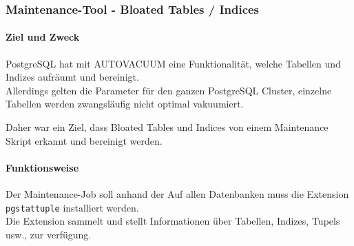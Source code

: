 
\begin{flushleft}
    \subsubsection{Maintenance-Tool - Bloated Tables / Indices}
    \paragraph{Ziel und Zweck}
    \Gls{PostgreSQL} hat mit \Gls{AUTOVACUUM} eine Funktionalität, welche Tabellen und Indizes aufräumt und bereinigt.\\
    Allerdings gelten die Parameter für den ganzen \Gls{PostgreSQL Cluster}, einzelne Tabellen werden zwangsläufig nicht optimal vakuumiert.\\
\end{flushleft}
\begin{flushleft}
    Daher war ein Ziel, dass Bloated Tables und Indices von einem Maintenance Skript erkannt und bereinigt werden.
\end{flushleft}
\begin{flushleft}
    \paragraph{Funktionsweise}
    Der Maintenance-Job soll anhand der
    Auf allen Datenbanken muss die Extension \texttt{pgstattuple} installiert werden.\\
    Die Extension sammelt und stellt Informationen über Tabellen, Indizes, Tupels usw., zur verfügung.
\end{flushleft}

